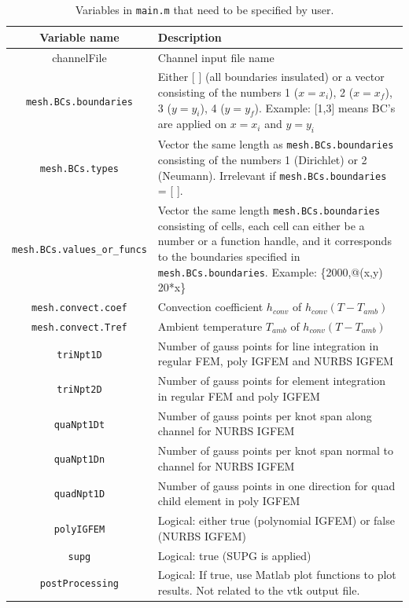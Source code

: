 \documentclass[11pt,letterpaper]{article}
\begin{document}
\begin{table}[!h]
\caption{Variables in \texttt{main.m} that need to be specified by user.}
\label{tab_main_variables1}
\centering
\begin{tabular}{|c|L|}
\hline
Variable name & Description\\
\hline
channelFile & Channel input file name\\
\hline
\texttt{mesh.BCs.boundaries} & Either [ ] (all boundaries insulated) or a vector consisting of the numbers  
1 ($x=x_i$), 2 ($x=x_f$), 3 ($y=y_i$), 4 ($y=y_f$). 
Example: [1,3] means BC's are applied on $x=x_i$ and $y=y_i$\\
\hline
\texttt{mesh.BCs.types} & Vector the same length as \texttt{mesh.BCs.boundaries} consisting of the numbers 
1 (Dirichlet) or 2 (Neumann). Irrelevant if \texttt{mesh.BCs.boundaries} = [ ]. \\
\hline
\texttt{mesh.BCs.values\_or\_funcs} & Vector the same length \texttt{mesh.BCs.boundaries} consisting of cells, 
each cell can either be a number or a function handle, and it corresponds to the boundaries specified in \texttt{mesh.BCs.boundaries}.
Example: \{2000,@(x,y) 20*x\}\ \\
\hline
\texttt{mesh.convect.coef} & Convection coefficient $h_{conv}$ of $h_{conv}(T-T_{amb})$ \\
\hline
\texttt{mesh.convect.Tref} & Ambient temperature $T_{amb}$ of $h_{conv}(T-T_{amb})$ \\
\hline
\texttt{triNpt1D} & Number of gauss points for line integration in regular FEM, poly IGFEM and NURBS IGFEM \\
\hline
\texttt{triNpt2D} & Number of gauss points for  element integration in regular FEM and poly IGFEM \\
\hline
\texttt{quaNpt1Dt} & Number of gauss points per knot span along channel for NURBS IGFEM \\
\hline
\texttt{quaNpt1Dn} & Number of gauss points per knot span normal to channel for NURBS IGFEM\\
\hline
\texttt{quadNpt1D} & Number of gauss points in one direction for quad child element in poly IGFEM\\
\hline
\texttt{polyIGFEM} & Logical: either true (polynomial IGFEM) or false (NURBS IGFEM) \\
\hline
\texttt{supg} & Logical: true (SUPG is applied) \\
\hline
\texttt{postProcessing} & Logical: If true, use Matlab plot functions to plot results. Not related to the vtk output file. 

\end{tabular}
\end{table}
\end{document}
